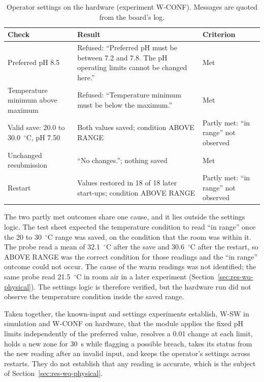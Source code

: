 \begin{table}[H]
\centering\begingroup\methodtabset
\caption{Operator settings on the hardware (experiment W-CONF). Messages are quoted from the board's
log.}
\label{tab:res-wconf}
\begin{tabularx}{\linewidth}{|Q{3.3cm}|Z|Q{2.8cm}|}
\hline
\textbf{Check} & \textbf{Result} & \textbf{Criterion} \\
\hline
Preferred pH 8.5 & Refused: ``Preferred pH must be between 7.2 and 7.8. The pH operating limits cannot be changed here.'' & Met \\ \hline
Temperature minimum above maximum & Refused: ``Temperature minimum must be below the maximum.'' & Met \\ \hline
Valid save: 20.0 to 30.0~$^\circ$C, pH 7.50 & Both values saved; condition ABOVE RANGE & Partly met: ``in range'' not observed \\ \hline
Unchanged resubmission & ``No changes.''; nothing saved & Met \\ \hline
Restart & Values restored in 18 of 18 later start-ups; condition ABOVE RANGE & Partly met: ``in range'' not observed \\ \hline
\end{tabularx}
\endgroup
\end{table}

The two partly met outcomes share one cause, and it lies outside the settings logic. The test sheet
expected the temperature condition to read ``in range'' once the 20 to 30~$^\circ$C range was saved,
on the condition that the room was within it. The probe read a mean of 32.1~$^\circ$C after the save
and 30.6~$^\circ$C after the restart, so ABOVE RANGE was the correct condition for those readings and
the ``in range'' outcome could not occur. The cause of the warm readings was not identified; the same
probe read 21.5~$^\circ$C in room air in a later experiment (Section~\ref{sec:res-wq-physical}). The
settings logic is therefore verified, but the hardware run did not observe the temperature condition
inside the saved range.

Taken together, the known-input and settings experiments establish, W-SW in simulation and W-CONF on
hardware, that the module applies the fixed pH limits independently of the preferred value, resolves
a 0.01 change at each limit, holds a new zone for 30~s while flagging a possible breach, takes its
status from the new reading after an invalid input, and keeps the operator's settings across restarts.
They do not establish that any reading is accurate, which is the subject of
Section~\ref{sec:res-wq-physical}.
